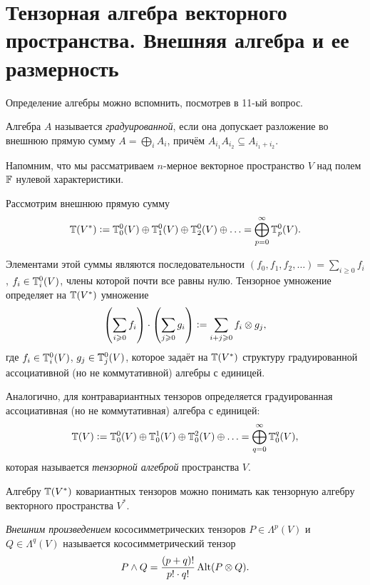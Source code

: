 \section{Тензорная алгебра векторного пространства. Внешняя алгебра и ее размерность}

Определение алгебры можно вспомнить, посмотрев в 11-ый вопрос.

\begin{definition}
    Алгебра $A$ называется \textit{градуированной}, если она допускает разложение во внешнюю прямую сумму $A = \bigoplus\limits_iA_i$, причём $A_{i_1}A_{i_2} \subseteq A_{i_1 + i_2}$.
\end{definition}

Напомним, что мы рассматриваем $n$-мерное векторное пространство $V$ над полем $\mathbb{F}$ нулевой характеристики.

Рассмотрим внешнюю прямую сумму
\[
    \mathbb{T}(V^\ast) \vcentcolon = \mathbb{T}_0^0(V) \oplus \mathbb{T}_1^0(V) \oplus \mathbb{T}_2^0(V) \oplus \ldots = \bigoplus_{p = 0}^\infty\mathbb{T}_p^0(V).
\]

Элементами этой суммы являются последовательности $(f_0, f_1, f_2, \ldots) = \sum_{i \geqslant 0}f_i$, $f_i \in \mathbb{T}_i^0(V)$, члены которой почти все равны нулю. Тензорное умножение определяет на $\mathbb{T}(V^\ast)$ умножение
\[
    \left(\sum_{i \geqslant 0}f_i\right) \cdot \left(\sum_{j \geqslant 0}g_i\right) \vcentcolon = \sum_{i + j \geqslant 0}f_i \otimes g_j,
\]
где $f_i \in \mathbb{T}_i^0(V)$, $g_j \in \mathbb{T}_j^0(V)$, которое задаёт на $\mathbb{T}(V^\ast)$ структуру градуированной ассоциативной (но не коммутативной) алгебры с единицей.

\begin{definition}
    Аналогично, для контравариантных тензоров определяется градуированная ассоциативная (но не коммутативная) алгебра с единицей:
    \[
        \mathbb{T}(V) \vcentcolon = \mathbb{T}_0^0(V) \oplus \mathbb{T}_0^1(V) \oplus \mathbb{T}_0^2(V) \oplus \ldots = \bigoplus_{q = 0}^\infty\mathbb{T}_0^q(V),
    \]
    которая называется \textit{тензорной алгеброй} пространства $V$.
\end{definition}

Алгебру $\mathbb{T}(V^\ast)$ ковариантных тензоров можно понимать как тензорную алгебру векторного пространства $V^\ast$.

\begin{definition}
    \textit{Внешним произведением} кососимметрических тензоров $P \in \Lambda^p(V)$ и $Q \in \Lambda^q(V)$ называется кососимметрический тензор
    \[
        P \wedge Q = \frac{(p + q)!}{p! \cdot q!}\operatorname{Alt}(P \otimes Q).
    \]
\end{definition}


